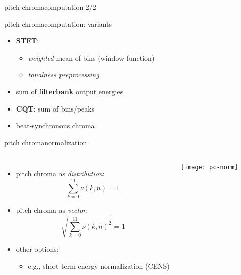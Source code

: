         \begin{frame}{pitch chroma}{computation 2/2}
        \end{frame}
        \begin{frame}{pitch chroma}{computation: variants}
            \begin{itemize}
                \item	\textbf{STFT}: 
                    \begin{itemize}
                        \item   \textit{weighted} mean of bins (window function)
                        \item	\textit{tonalness preprocessing}
                    \end{itemize}
                \item<2->	sum of \textbf{filterbank} output energies
                \item<3->	\textbf{CQT}: sum of bins/peaks
                \item<4->   beat-synchronous chroma
            \end{itemize}
        \end{frame}
        \begin{frame}{pitch chroma}{normalization}
            \begin{columns}[T]
                    \begin{itemize}
                        \item   pitch chroma as \textit{distribution}:
                            \begin{equation*}
                                \sum\limits_{k=0}^{11}{\nu(k,n)} = 1
                            \end{equation*}
                        \item<2->   pitch chroma as \textit{vector}:
                            \begin{equation*}
                                \sqrt{\sum\limits_{k=0}^{11}{\nu(k,n)^2}} = 1
                            \end{equation*}
                        \item<3-> other options:
                            \begin{itemize}
                                \item   e.g., short-term energy normalization (CENS)
                            \end{itemize}
                    \end{itemize}
                    \texttt{[image: pc-norm]}
            \end{columns}
            
        \end{frame}
        

